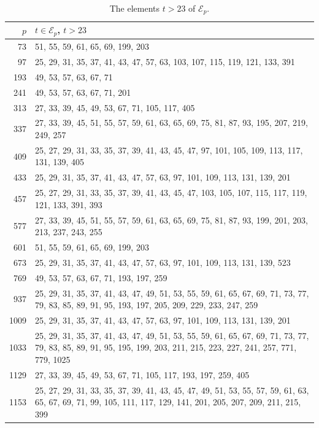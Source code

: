 \documentclass[12pt]{amsart}
\renewcommand{\baselinestretch}{1.3}
\theoremstyle{definition}
\newcommand{\cE}{\mathcal{E}}
\begin{document}
\begin{table}[ht]
\caption{The elements $t>23$ of $\cE_p$.}\label{tab:sets}
\renewcommand{\baselinestretch}{1}\selectfont
\footnotesize
\renewcommand{\arraystretch}{1.1}
\begin{tabular}{r p{}}
\hline
$p$ & $t\in\cE_p$, $t>23$\\
\hline
73 & 51, 55, 59, 61, 65, 69, 199, 203\\
97 & 25, 29, 31, 35, 37, 41, 43, 47, 57, 63, 103, 107, 115, 119, 121, 133, 391\\
193 & 49, 53, 57, 63, 67, 71\\
241 & 49, 53, 57, 63, 67, 71, 201\\
313 & 27, 33, 39, 45, 49, 53, 67, 71, 105, 117, 405\\
337 & 27, 33, 39, 45, 51, 55, 57, 59, 61, 63, 65, 69, 75, 81, 87, 93, 195, 207, 219, 249, 257\\
409 & 25, 27, 29, 31, 33, 35, 37, 39, 41, 43, 45, 47, 97, 101, 105, 109, 113, 117, 131, 139, 405\\
433 & 25, 29, 31, 35, 37, 41, 43, 47, 57, 63, 97, 101, 109, 113, 131, 139, 201\\
457 & 25, 27, 29, 31, 33, 35, 37, 39, 41, 43, 45, 47, 103, 105, 107, 115, 117, 119, 121, 133, 391, 393\\
577 & 27, 33, 39, 45, 51, 55, 57, 59, 61, 63, 65, 69, 75, 81, 87, 93, 199, 201, 203, 213, 237, 243, 255\\
601 & 51, 55, 59, 61, 65, 69, 199, 203\\
673 & 25, 29, 31, 35, 37, 41, 43, 47, 57, 63, 97, 101, 109, 113, 131, 139, 523\\
769 & 49, 53, 57, 63, 67, 71, 193, 197, 259\\
937 & 25, 29, 31, 35, 37, 41, 43, 47, 49, 51, 53, 55, 59, 61, 65, 67, 69, 71, 73, 77, 79, 83, 85, 89, 91, 95, 193, 197, 205, 209, 229, 233, 247, 259\\
1009 & 25, 29, 31, 35, 37, 41, 43, 47, 57, 63, 97, 101, 109, 113, 131, 139, 201\\
1033 & 25, 29, 31, 35, 37, 41, 43, 47, 49, 51, 53, 55, 59, 61, 65, 67, 69, 71, 73, 77, 79, 83, 85, 89, 91, 95, 195, 199, 203, 211, 215, 223, 227, 241, 257, 771, 779, 1025\\
1129 & 27, 33, 39, 45, 49, 53, 67, 71, 105, 117, 193, 197, 259, 405\\
1153 & 25, 27, 29, 31, 33, 35, 37, 39, 41, 43, 45, 47, 49, 51, 53, 55, 57, 59, 61, 63, 65, 67, 69, 71, 99, 105, 111, 117, 129, 141, 201, 205, 207, 209, 211, 215, 399\\

\end{tabular}
\end{table}
\end{document}
